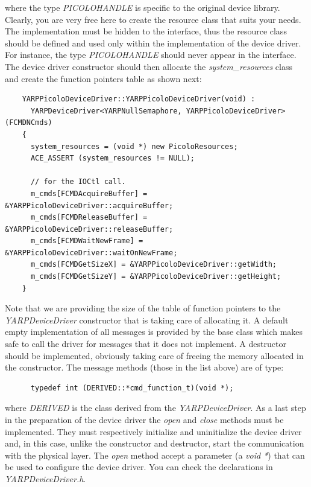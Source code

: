 \noindent where the type {\em PICOLOHANDLE} is specific to the original device library. Clearly, you are very free here to create the resource class that suits your needs. The implementation must be hidden to the interface, thus the resource class should be defined and used only within the implementation of the device driver. For instance, the type {\em PICOLOHANDLE} should never appear in the interface. The device driver constructor should then allocate the {\em system\_resources} class and create the function pointers table as shown next:

\begin{verbatim}
    YARPPicoloDeviceDriver::YARPPicoloDeviceDriver(void) : 
      YARPDeviceDriver<YARPNullSemaphore, YARPPicoloDeviceDriver>(FCMDNCmds)
    {
      system_resources = (void *) new PicoloResources;
      ACE_ASSERT (system_resources != NULL);

      // for the IOCtl call.
      m_cmds[FCMDAcquireBuffer] = &YARPPicoloDeviceDriver::acquireBuffer;
      m_cmds[FCMDReleaseBuffer] = &YARPPicoloDeviceDriver::releaseBuffer;
      m_cmds[FCMDWaitNewFrame] = &YARPPicoloDeviceDriver::waitOnNewFrame;
      m_cmds[FCMDGetSizeX] = &YARPPicoloDeviceDriver::getWidth;
      m_cmds[FCMDGetSizeY] = &YARPPicoloDeviceDriver::getHeight;
    }
\end{verbatim}

Note that we are providing the size of the table of function pointers to the {\em YARPDeviceDriver} constructor that is taking care of allocating it. A default empty implementation of all messages is provided by the base class which makes safe to call the driver for messages that it does not implement. A destructor should be implemented, obviously taking care of freeing the memory allocated in the constructor. The message methods (those in the list above) are of type:

\begin{verbatim}
      typedef int (DERIVED::*cmd_function_t)(void *); 
\end{verbatim}

\noindent where {\em DERIVED} is the class derived from the {\em YARPDeviceDriver}. As a last step in the preparation of the device driver the {\em open} and {\em close} methods must be implemented. They must respectively initialize and uninitialize the device driver and, in this case, unlike the constructor and destructor, start the communication with the physical layer. The {\em open} method accept a parameter (a {\em void *}) that can be used to configure the device driver. You can check the declarations in {\em YARPDeviceDriver.h}.

